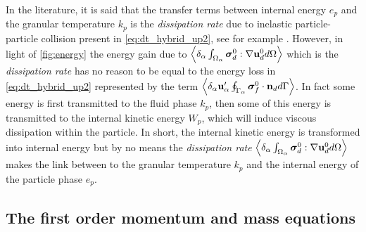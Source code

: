 In the literature, it is said that the transfer terms between internal energy $e_p$ and the granular temperature $k_p$ is the \textit{dissipation rate} due to inelastic particle-particle collision present in \ref{eq:dt_hybrid_up2}, see for example \citet{fox2014multiphase,rao2008introduction}. 
However, in light of \ref{fig:energy} the energy gain due to  $\left<\delta_\alpha \int_{\Omega_\alpha} \bm{\sigma}_d^0:\mathbf{\nabla} \textbf{u}_d^0 d\Omega\right>$ which is the \textit{dissipation rate} has no reason to be equal to the energy loss in \ref{eq:dt_hybrid_up2} represented by the term $\left<\delta_\alpha \textbf{u}_\alpha' \oint_{\Gamma_\alpha} \bm{\sigma}_f^0 \cdot \textbf{n}_d d\Gamma\right>$. 
In fact some energy is first transmitted to the fluid phase $k_p$, then some of this energy is transmitted to the internal kinetic energy $W_p$, which will induce viscous dissipation within the particle. 
In short, the internal kinetic energy is transformed into internal energy but by no means the \textit{dissipation rate} $\left<\delta_\alpha \int_{\Omega_\alpha} \bm{\sigma}_d^0:\mathbf{\nabla} \textbf{u}_d^0 d\Omega\right>$ makes the link between to the granular temperature $k_p$ and the internal energy of the particle phase $e_p$. 

\subsection{The first order momentum and mass equations}

